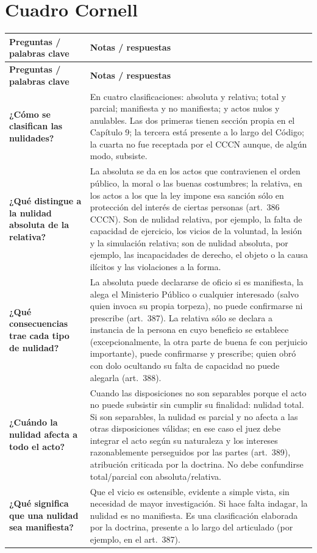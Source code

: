 \documentclass[12pt,oneside]{book}
\newcommand{\cornellhead}{%
    \toprule
    \textbf{Preguntas / palabras clave} & \textbf{Notas / respuestas} \\
    \midrule
}
\newcommand{\cornellrow}[2]{\textbf{#1} & #2 \\[1.3em]}
\begin{document}
\clearpage
\section{Cuadro Cornell}

\begin{longtable}{@{}QW@{}}
\cornellhead \endfirsthead
\cornellhead \endhead
\bottomrule \endfoot

\cornellrow{¿Cómo se clasifican las nulidades?}{En cuatro clasificaciones: absoluta y relativa; total y parcial; manifiesta y no manifiesta; y actos nulos y anulables. Las dos primeras tienen sección propia en el Capítulo 9; la tercera está presente a lo largo del Código; la cuarta no fue receptada por el CCCN aunque, de algún modo, subsiste.}

\cornellrow{¿Qué distingue a la nulidad absoluta de la relativa?}{La absoluta se da en los actos que contravienen el orden público, la moral o las buenas costumbres; la relativa, en los actos a los que la ley impone esa sanción sólo en protección del interés de ciertas personas (art.~386 CCCN). Son de nulidad relativa, por ejemplo, la falta de capacidad de ejercicio, los vicios de la voluntad, la lesión y la simulación relativa; son de nulidad absoluta, por ejemplo, las incapacidades de derecho, el objeto o la causa ilícitos y las violaciones a la forma.}

\cornellrow{¿Qué consecuencias trae cada tipo de nulidad?}{La absoluta puede declararse de oficio si es manifiesta, la alega el Ministerio Público o cualquier interesado (salvo quien invoca su propia torpeza), no puede confirmarse ni prescribe (art.~387). La relativa sólo se declara a instancia de la persona en cuyo beneficio se establece (excepcionalmente, la otra parte de buena fe con perjuicio importante), puede confirmarse y prescribe; quien obró con dolo ocultando su falta de capacidad no puede alegarla (art.~388).}

\cornellrow{¿Cuándo la nulidad afecta a todo el acto?}{Cuando las disposiciones no son separables porque el acto no puede subsistir sin cumplir su finalidad: nulidad total. Si son separables, la nulidad es parcial y no afecta a las otras disposiciones válidas; en ese caso el juez debe integrar el acto según su naturaleza y los intereses razonablemente perseguidos por las partes (art.~389), atribución criticada por la doctrina. No debe confundirse total/parcial con absoluta/relativa.}

\cornellrow{¿Qué significa que una nulidad sea manifiesta?}{Que el vicio es ostensible, evidente a simple vista, sin necesidad de mayor investigación. Si hace falta indagar, la nulidad es no manifiesta. Es una clasificación elaborada por la doctrina, presente a lo largo del articulado (por ejemplo, en el art.~387).}


\end{longtable}
\end{document}
